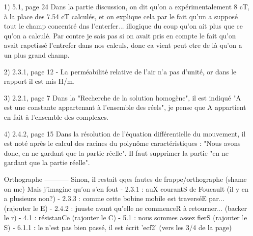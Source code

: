 
1) 5.1, page 24
Dans la partie discussion, on dit qu'on a expérimentalement 8 cT, à la place des 7.54 cT calculés, et on explique 
cela par le fait qu'un a supposé tout le champ concentré dns l'enterfer... illogique du coup qu'on ait plus que ce qu'on a calculé.
Par contre je sais pas si on avait pris en compte le fait qu'on avait rapetissé l'entrefer dans nos calculs, donc ca vient peut
etre de là qu'on a un plus grand champ.

2) 2.3.1, page 12
- La perméabilité relative de l'air n'a pas d'unité, or dans le rapport il est mis H/m.

3) 2.2.1, page 7
Dans la "Recherche de la solution homogène", il est indiqué "A est une constante appartenant
à l'ensemble des réels", je pense que A appartient en fait à l'ensemble des complexes.

4) 2.4.2, page 15
Dans la résolution de l'équation différentielle du mouvement, il est noté après le calcul
des racines du polynôme caractéristiques : "Nous avons donc, en ne gardant que la partie réelle".
Il faut supprimer la partie "en ne gardant que la partie réelle".

Orthographe
-----------
Sinon, il restait qqes fautes de frappe/orthographe (shame on me) Mais j'imagine qu'on s'en fout
- 2.3.1 : auX courantS de Foucault (il y en a plusieurs non?)
- 2.3.3 : comme cette bobine mobile est traverséE par... (rajouter le E)
- 2.4.2 : juuste avant qu'elle ne commenceR à retourner... (backer le r)
- 4.1 : résistanCe (rajouter le C)
- 5.1 : nous sommes assez fierS (rajouter le S)
- 6.1.1 : le \vec n'est pas bien passé, il est écrit 'ecf2' (vers les 3/4 de la page)

